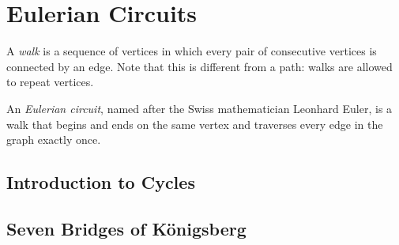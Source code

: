 \documentclass[11pt]{article}
\begin{document}
\section{Eulerian Circuits}

\begin{definition}
\label{def:eulerian-circuit}
A \textit{walk} is a sequence of vertices in which every pair of consecutive vertices is connected by an edge. Note that this is different from a path: walks are allowed
to repeat vertices.
\end{definition}

\begin{definition}
\label{def:eulerian-circuit}
An \textit{Eulerian circuit}, named after the Swiss mathematician Leonhard Euler, is a walk that begins and ends on the same vertex and traverses every edge in the
graph exactly once.
\end{definition}

\begin{problem}

\end{problem}

\subsection{Introduction to Cycles}

\subsection{Seven Bridges of K\"{o}nigsberg}
\end{document}
